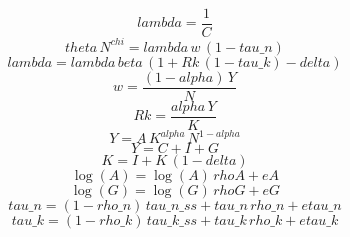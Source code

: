 \begin{dmath}
{lambda}=\frac{1}{{C}}
\end{dmath}
\begin{dmath}
{theta}\, {N}^{{chi}}={lambda}\, {w}\, \left(1-{tau\_n}\right)
\end{dmath}
\begin{dmath}
{lambda}={lambda}\, {beta}\, \left(1+{Rk}\, \left(1-{tau\_k}\right)-{delta}\right)
\end{dmath}
\begin{dmath}
{w}=\frac{\left(1-{alpha}\right)\, {Y}}{{N}}
\end{dmath}
\begin{dmath}
{Rk}=\frac{{alpha}\, {Y}}{{K}}
\end{dmath}
\begin{dmath}
{Y}={A}\, {K}^{{alpha}}\, {N}^{1-{alpha}}
\end{dmath}
\begin{dmath}
{Y}={C}+{I}+{G}
\end{dmath}
\begin{dmath}
{K}={I}+{K}\, \left(1-{delta}\right)
\end{dmath}
\begin{dmath}
\log\left({A}\right)=\log\left({A}\right)\, {rhoA}+{eA}
\end{dmath}
\begin{dmath}
\log\left({G}\right)=\log\left({G}\right)\, {rhoG}+{eG}
\end{dmath}
\begin{dmath}
{tau\_n}=\left(1-{rho\_n}\right)\, {tau\_n\_ss}+{tau\_n}\, {rho\_n}+{etau\_n}
\end{dmath}
\begin{dmath}
{tau\_k}=\left(1-{rho\_k}\right)\, {tau\_k\_ss}+{tau\_k}\, {rho\_k}+{etau\_k}
\end{dmath}
